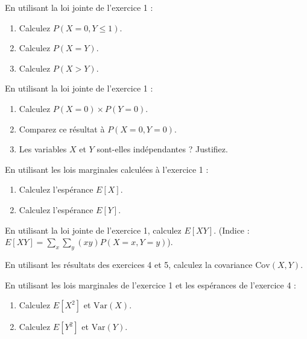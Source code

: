 \begin{exercicebox}
En utilisant la loi jointe de l'exercice 1 :
\begin{enumerate}
    \item Calculez $P(X=0, Y \le 1)$.
    \item Calculez $P(X=Y)$.
    \item Calculez $P(X > Y)$.
\end{enumerate}
\end{exercicebox}

\begin{exercicebox}
En utilisant la loi jointe de l'exercice 1 :
\begin{enumerate}
    \item Calculez $P(X=0) \times P(Y=0)$.
    \item Comparez ce résultat à $P(X=0, Y=0)$.
    \item Les variables $X$ et $Y$ sont-elles indépendantes ? Justifiez.
\end{enumerate}
\end{exercicebox}


\begin{exercicebox}
En utilisant les lois marginales calculées à l'exercice 1 :
\begin{enumerate}
    \item Calculez l'espérance $E[X]$.
    \item Calculez l'espérance $E[Y]$.
\end{enumerate}
\end{exercicebox}

\begin{exercicebox}
En utilisant la loi jointe de l'exercice 1, calculez $E[XY]$.
(Indice : $E[XY] = \sum_x \sum_y (xy) P(X=x, Y=y)$).
\end{exercicebox}

\begin{exercicebox}
En utilisant les résultats des exercices 4 et 5, calculez la covariance $\text{Cov}(X,Y)$.
\end{exercicebox}

\begin{exercicebox}
En utilisant les lois marginales de l'exercice 1 et les espérances de l'exercice 4 :
\begin{enumerate}
    \item Calculez $E[X^2]$ et $\text{Var}(X)$.
    \item Calculez $E[Y^2]$ et $\text{Var}(Y)$.
\end{enumerate}
\end{exercicebox}

